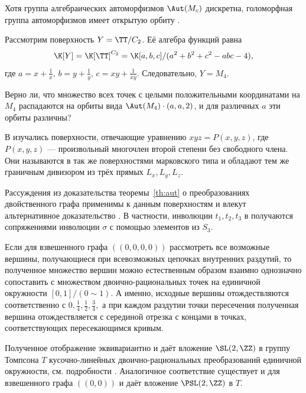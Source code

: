 \begin{remark}
Хотя группа алгебраических автоморфизмов $\Aut(M_c)$ дискретна, голоморфная группа автоморфизмов имеет открытую орбиту \cite[Theorem 1.4]{KKL20}.
\end{remark}

\begin{example}
Рассмотрим поверхность $Y=\TT/C_2$. Её алгебра функций равна \[\K[Y]=\K[\TT]^{C_2}=\K[a,b,c]/(a^2+b^2+c^2-abc-4),\] где $a=x+\frac{1}{x},\,b=y+\frac{1}{y},\,c=xy+\frac{1}{xy}$. Следовательно, $Y=M_4$. 
\end{example}

\begin{question}
Верно ли, что множество всех точек с целыми положительными координатами на $M_4$ распадаются на орбиты вида $\Aut(M_4)\cdot(a,a,2)$, и для различных $a$ эти орбиты различны?
\end{question}



\begin{remark}
В \cite{El74} изучались поверхности, отвечающие уравнению $xyz = P(x,y,z)$, где $P(x,y,z)$ --- произвольный многочлен второй степени без свободного члена. Они называются в \cite{El74} так же поверхностями марковского типа и обладают тем же граничным дивизором из трёх прямых $L_x,L_y,L_z$.

Рассуждения из доказательства теоремы~\ref{th:aut} о преобразованиях двойственного графа применимы к данным поверхностям и влекут альтернативное доказательство \cite[Теорема 2]{El74}.
В частности, инволюции $t_1,t_2,t_3$ в \cite{El74} получаются сопряжениями инволюции $\sigma$ с помощью элементов из $S_3$.
\end{remark}



\begin{remark}
Если для взвешенного графа $((0,0,0,0))$  рассмотреть все возможные вершины, получающиеся при всевозможных цепочках внутренних раздутий, то полученное множество вершин можно естественным образом взаимно однозначно сопоставить с множеством двоично-рациональных точек на единичной окружности $[0,1]/(0\sim 1)$. А именно, исходные вершины отождествляются соответственно с $0,\frac{1}{4},\frac{1}{2},\frac{3}{4},$ а при каждом раздутии точки пересечения полученная вершина отождествляется с серединой отрезка с концами в точках, соответствующих пересекающимся кривым.

Полученное отображение эквивариантно и даёт вложение $\SL(2,\ZZ)$ в группу Томпсона $T$ кусочно-линейных двоично-рациональных преобразований единичной окружности, см. подробности \cite{GhSe87, Fo10, DiLi16}.
Аналогичное соответствие существует и для взвешенного графа $((0,0))$ и даёт вложение $\PSL(2,\ZZ)$ в $T$.
\end{remark}
